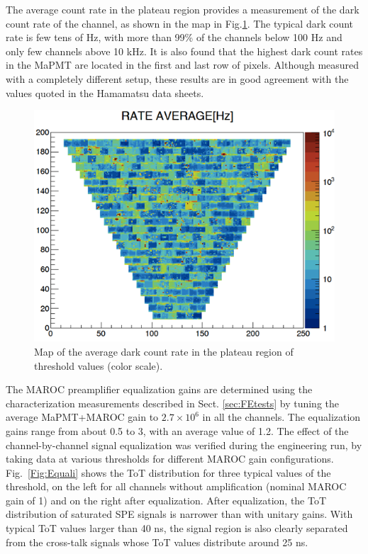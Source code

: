\documentclass[5p,times,twocolumn]{elsarticle}
\begin{document}
The average count rate in the plateau region provides a measurement of the dark count rate of the channel, as shown in the map in Fig.\ref{fig:DarkCountMap}. The typical dark count rate is few tens of Hz, with more than 99\% of the channels below 100 Hz and only few channels above 10 kHz. It is also found that the highest dark count rates in the MaPMT are located in the first and last row of pixels. Although measured with a completely different setup, these results are in good agreement with the values quoted in the Hamamatsu data sheets.

\begin{figure}[t]
\begin{center}
\includegraphics[width=1.0\columnwidth]{DarkCountMap.png}
\end{center}
\caption{Map of the average dark count rate in the plateau region of threshold values (color scale).}
\label{fig:DarkCountMap}
\end{figure}

The MAROC preamplifier equalization gains are determined using the characterization measurements described in Sect. \ref{sec:FEtests} by tuning the average MaPMT+MAROC gain to $2.7\times 10^6$ in all the channels. The equalization gains range from about 0.5 to 3, with an average value of 1.2.
The effect of the channel-by-channel signal equalization was verified during the engineering run, by taking data at various thresholds for different MAROC gain configurations.  Fig.~\ref{Fig:Equali} shows the ToT distribution for three typical values of the threshold, on the left for all channels without amplification (nominal MAROC gain of 1) and on the right after equalization. After equalization, the ToT distribution of saturated SPE signals is narrower than with unitary gains.  With typical ToT values larger than 40 ns, the signal region is also clearly separated from the cross-talk signals whose ToT values distribute around 25 ns.
\end{document}
